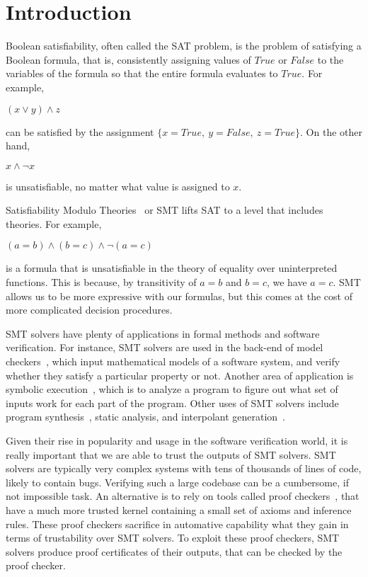 \documentclass{article}
\begin{document}
\section{Introduction}
\label{sec:intro}
Boolean satisfiability, often called the SAT problem, 
is the problem of satisfying a Boolean formula, that is, 
consistently assigning values of $True$ or $False$ to the variables 
of the formula so that the entire formula evaluates to $True$. 
For example,
\begin{center}$(x \lor y) \land z$ \end{center}
can be satisfied by the 
assignment $\{x=True,\ y=False,\ z=True\}$. On the other hand, 
\begin{center} $x \land \neg x$ \end{center}
is unsatisfiable, no matter what value is assigned to $x$.

Satisfiability Modulo Theories~\cite{DBLP:reference/mc/BarrettT18} 
or SMT lifts SAT to a level that includes theories. 
For example, 
\begin{center} $(a = b) \land (b = c) \land \neg (a = c)$ 
\end{center}
is a formula that is unsatisfiable in the theory of 
equality over uninterpreted functions. This is because, by
transitivity of $a = b$ and $b = c$, we have $a = c$. SMT 
allows us to be more expressive with our formulas, but 
this comes at the cost of more complicated decision 
procedures.

SMT solvers have plenty of applications in formal methods 
and software verification. For instance, SMT solvers are used 
in the back-end of model checkers~\cite{DBLP:books/daglib/0020348}, 
which input mathematical 
models of a software system, and verify whether they 
satisfy a particular property or not. Another area of 
application is symbolic
execution~\cite{DBLP:journals/csur/BaldoniCDDF18}, 
which is to analyze a 
program to figure out what set of inputs work for each 
part of the program. Other uses of SMT solvers include 
program synthesis~\cite{synth}, static analysis, 
and interpolant generation~\cite{DBLP:journals/corr/abs-1111-5652}.

Given their rise in popularity and usage in the software 
verification world, it is really important that we are able 
to trust the outputs of SMT solvers. SMT solvers are typically 
very complex systems with tens of thousands of lines of code, 
likely to contain bugs. Verifying such a large codebase can 
be a cumbersome, if not impossible task. An alternative is 
to rely on tools called proof checkers~\cite{proofasst}, 
that have a much more trusted kernel containing a small 
set of axioms and inference rules. These proof checkers 
sacrifice in automative capability what they gain in terms 
of trustability over SMT solvers. To exploit these proof 
checkers, SMT solvers produce proof certificates of their 
outputs, that can be checked by the proof checker.
\end{document}
